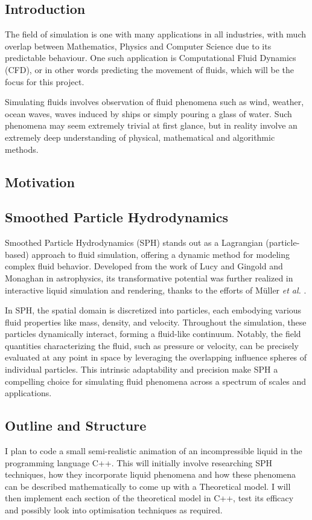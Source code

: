 \documentclass[a4paper,11pt]{article}
\begin{document}
\begin{multicols}{2}
\section{Introduction}
The field of simulation is one with many applications in all industries, with much overlap between Mathematics, Physics and Computer Science due to its predictable behaviour. One such application is Computational Fluid Dynamics (CFD), or in other words predicting the movement of fluids, which will be the focus for this project.

Simulating fluids involves observation of fluid phenomena such as wind, weather, ocean waves, waves induced by ships or simply pouring a glass of water. Such phenomena may seem extremely trivial at first glance, but in reality involve an extremely deep understanding of physical, mathematical and algorithmic methods.

\subsection{Motivation}

\subsection{Smoothed Particle Hydrodynamics}
Smoothed Particle Hydrodynamics (SPH) stands out as a Lagrangian (particle-based) approach to fluid simulation, offering a dynamic method for modeling complex fluid behavior. Developed from the work of Lucy \cite{lucy} and Gingold and Monaghan \cite{gingold} in astrophysics, its transformative potential was further realized in interactive liquid simulation and rendering, thanks to the efforts of Müller \textit{et al.} \cite{muller}.

In SPH, the spatial domain is discretized into particles, each embodying various fluid properties like mass, density, and velocity. Throughout the simulation, these particles dynamically interact, forming a fluid-like continuum. Notably, the field quantities characterizing the fluid, such as pressure or velocity, can be precisely evaluated at any point in space by leveraging the overlapping influence spheres of individual particles. This intrinsic adaptability and precision make SPH a compelling choice for simulating fluid phenomena across a spectrum of scales and applications.

\subsection{Outline and Structure}
I plan to code a small semi-realistic animation of an incompressible liquid in the programming language C++. This will initially involve researching SPH techniques, how they incorporate liquid phenomena and how these phenomena can be described mathematically to come up with a Theoretical model. I will then implement each section of the theoretical model in C++, test its efficacy and possibly look into optimisation techniques as required.


\end{multicols}
\end{document}
